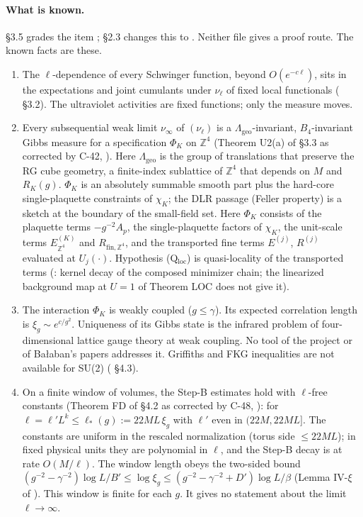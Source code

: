 \paragraph{What is known.}  \S3.5 grades the item ;  \S2.3 changes this to . Neither file gives a proof route. The known facts are these.
\begin{enumerate}
\item The $\ell$-dependence of every Schwinger function, beyond $O(e^{-c\ell})$, sits in the expectations and joint cumulants under $\nu_\ell$ of fixed local functionals ( \S3.2). The ultraviolet activities are fixed functions; only the measure moves.
\item Every subsequential weak limit $\nu_\infty$ of $(\nu_\ell)$ is a $\Lambda_{\mathrm{geo}}$-invariant, $B_4$-invariant Gibbs measure for a specification $\Phi_K$ on $\mathbb Z^4$ (Theorem U2(a) of  \S3.3 as corrected by  C-42, ). Here $\Lambda_{\mathrm{geo}}$ is the group of translations that preserve the RG cube geometry, a finite-index sublattice of $\mathbb Z^4$ that depends on $M$ and $R_K(g)$. $\Phi_K$ is an absolutely summable smooth part plus the hard-core single-plaquette constraints of $\chi_K$; the DLR passage (Feller property) is a sketch at the boundary of the small-field set. Here $\Phi_K$ consists of the plaquette terms $-g^{-2}A_p$, the single-plaquette factors of $\chi_K$, the unit-scale terms $E^{(K)}_{\mathbb Z^4}$ and $R_{\mathrm{fin},\mathbb Z^4}$, and the transported fine terms $E^{(j)}$, $R^{(j)}$ evaluated at $U_j(\cdot)$. Hypothesis (Q$_{\mathrm{loc}}$) is quasi-locality of the transported terms (: kernel decay of the composed minimizer chain; the linearized background map at $U=1$ of Theorem LOC does not give it).
\item The interaction $\Phi_K$ is weakly coupled ($g\le\gamma$). Its expected correlation length is $\xi_g\sim e^{c/g^2}$. Uniqueness of its Gibbs state is the infrared problem of four-dimensional lattice gauge theory at weak coupling. No tool of the project or of Ba{\l}aban's papers addresses it. Griffiths and FKG inequalities are not available for SU(2) ( \S4.3).
\item On a finite window of volumes, the Step-B estimates hold with $\ell$-free constants (Theorem FD of  \S4.2 as corrected by  C-48, ): for $\ell=\ell'L^k\le\ell_*(g):=22ML\,\xi_g$ with $\ell'$ even in $(22M,22ML]$. The constants are uniform in the rescaled normalization (torus side $\le22ML$); in fixed physical units they are polynomial in $\ell$, and the Step-B decay is at rate $O(M/\ell)$. The window length obeys the two-sided bound $(g^{-2}-\gamma^{-2})\log L/B'\le\log\xi_g\le(g^{-2}-\gamma^{-2}+D')\log L/\beta$ (Lemma IV-$\xi$ of ). This window is finite for each $g$. It gives no statement about the limit $\ell\to\infty$.
\end{enumerate}

